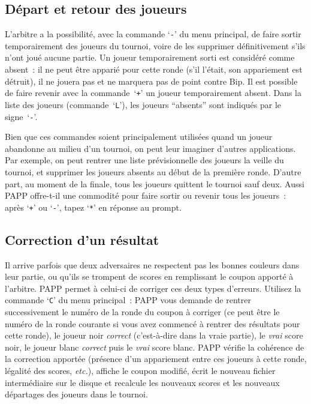 \documentclass[10pt]{article}
\begin{document}
\subsection{D\'epart et retour des joueurs}

L'arbitre a la possibilit\'e, avec la commande `\verb|-|' du menu 
principal, de faire sortir temporairement des joueurs du tournoi, 
voire de les supprimer d\'efini\-tivement s'ils n'ont jou\'e aucune 
partie.  Un joueur temporairement sorti est consid\'er\'e comme 
absent~: il ne peut \^etre appari\'e pour cette ronde (s'il l'\'etait, 
son appariement est d\'etruit), il ne jouera pas et ne marquera pas de 
point contre Bip.  Il est possible de faire revenir avec la 
commande~`\verb|+|' un joueur temporairement absent.  Dans la liste 
des joueurs (commande~`\verb|L|'), les joueurs ``absents'' sont 
indiqu\'es par le signe~`\verb|-|'.

Bien que ces commandes soient principalement utilis\'ees quand un 
joueur abandonne au milieu d'un tournoi, on peut leur imaginer 
d'autres applications.  Par exemple, on peut rentrer une liste 
pr\'evisionnelle des joueurs la veille du tournoi, et supprimer les 
joueurs absents au d\'ebut de la premi\`ere ronde.  D'autre part, au 
moment de la finale, tous les joueurs quittent le tournoi sauf deux.  
Aussi PAPP offre-t-il une commodit\'e pour faire sortir ou revenir 
tous les joueurs~: apr\`es `\verb|+|' ou `\verb|-|', tapez `\verb|*|' 
en r\'eponse au prompt.

\subsection{Correction d'un r\'esultat}

Il arrive parfois que deux adversaires ne respectent pas les bonnes 
couleurs dans leur partie, ou qu'ils se trompent de scores en 
remplissant le coupon apport\'e \`a l'arbitre.  PAPP permet \`a 
celui-ci de corriger ces deux types d'erreurs.  Utilisez la commande 
`\verb|C|' du menu principal~: PAPP vous demande de rentrer 
successivement le num\'ero de la ronde du coupon \`a corriger (ce peut 
\^etre le num\'ero de la ronde courante si vous avez commenc\'e \`a 
rentrer des r\'esultats pour cette ronde), le joueur noir 
\emph{correct} (c'est-\`a-dire dans la vraie partie), le \emph{vrai} 
score noir, le joueur blanc \emph{correct} puis le \emph{vrai} score 
blanc.  PAPP v\'erifie la coh\'erence de la correction apport\'ee 
(pr\'esence d'un appariement entre ces joueurs \`a cette ronde, 
l\'egalit\'e des scores, \emph{etc.}), affiche le coupon modifi\'e, 
\'ecrit le nouveau fichier interm\'ediaire sur le disque et recalcule 
les nouveaux scores et les nouveaux d\'epartages des joueurs dans le 
tournoi.
\end{document}
